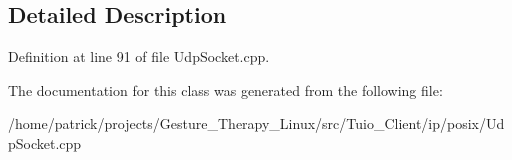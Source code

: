 \subsection{Detailed Description}


Definition at line 91 of file Udp\+Socket.\+cpp.



The documentation for this class was generated from the following file\+:\begin{DoxyCompactItemize}
\item 
/home/patrick/projects/\+Gesture\+\_\+\+Therapy\+\_\+\+Linux/src/\+Tuio\+\_\+\+Client/ip/posix/Udp\+Socket.\+cpp\end{DoxyCompactItemize}
